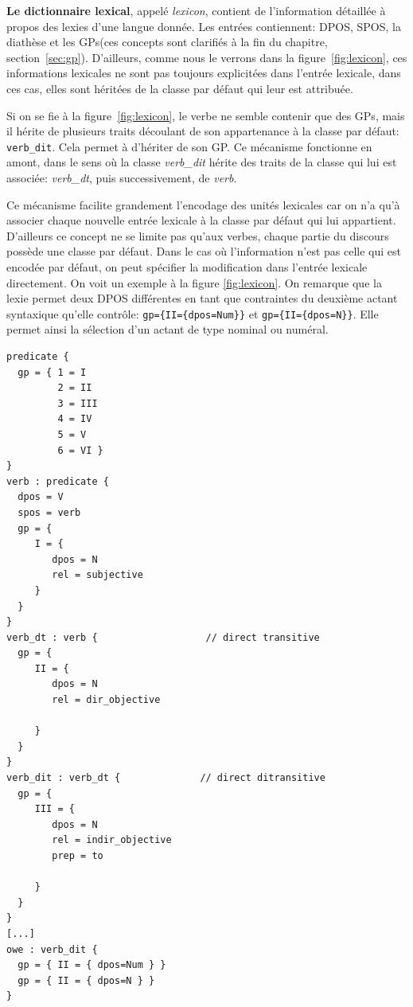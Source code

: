 \textbf{Le dictionnaire lexical}, appelé \emph{lexicon}, contient de l'information détaillée à propos des lexies d'une langue donnée. Les entrées contiennent: \ac{DPOS}, \ac{SPOS}, la diathèse et les \acp{GP}(ces concepts sont clarifiés à la fin du chapitre, section~\ref{sec:gp}). D'ailleurs, comme nous le verrons dans la figure~\ref{fig:lexicon}, ces informations lexicales ne sont pas toujours explicitées dans l'entrée lexicale, dans ces cas, elles sont héritées de la classe par défaut qui leur est attribuée.

Si on se fie à la figure~\ref{fig:lexicon}, le verbe  ne semble contenir que des \acp{GP}, mais il hérite de plusieurs traits découlant de son appartenance à la classe par défaut: \texttt{verb\_dit}. Cela permet à  d'hériter de son \ac{GP}. Ce mécanisme fonctionne en amont, dans le sens où la classe \emph{verb\_dit} hérite des traits de la classe qui lui est associée: \emph{verb\_dt}, puis successivement, de \emph{verb}.

Ce mécanisme facilite grandement l'encodage des unités lexicales car on n'a qu'à associer chaque nouvelle entrée lexicale à la classe par défaut qui lui appartient. D'ailleurs ce concept ne se limite pas qu'aux verbes, chaque partie du discours possède une classe par défaut. Dans le cas où l'information n'est pas celle qui est encodée par défaut, on peut spécifier la modification dans l'entrée lexicale directement. On voit un exemple à la figure \ref{fig:lexicon}. On remarque que la lexie  permet deux \ac{DPOS} différentes en tant que contraintes du deuxième actant syntaxique qu'elle contrôle: \lstinline!gp={II={dpos=Num}}! et \lstinline!gp={II={dpos=N}}!. Elle permet ainsi la sélection d'un actant de type nominal ou numéral.

\begin{minipage}{\linewidth}
\begin{lstlisting}[language=Xml, caption = Échantillon du \emph{lexicon}, label=fig:lexicon]
predicate {
  gp = { 1 = I
         2 = II
         3 = III
         4 = IV
         5 = V
         6 = VI }
}
verb : predicate {
  dpos = V
  spos = verb
  gp = {
     I = {
        dpos = N
        rel = subjective
     }
  }
}
verb_dt : verb {                   // direct transitive
  gp = {
     II = {
        dpos = N
        rel = dir_objective

     }
  }
}
verb_dit : verb_dt {              // direct ditransitive
  gp = {
     III = {
        dpos = N
        rel = indir_objective
        prep = to  

     }
  }
}
[...]
owe : verb_dit {
  gp = { II = { dpos=Num } }
  gp = { II = { dpos=N } }
}
\end{lstlisting}
\end{minipage}

